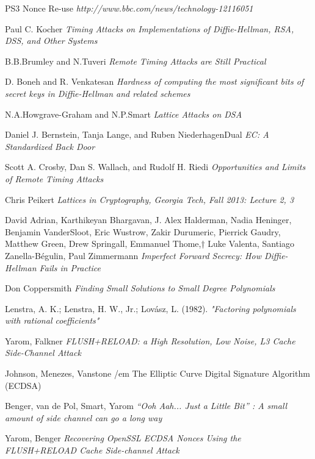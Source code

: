 \documentclass[a4paper,11pt]{article}
\begin{document}
\newpage

\begin{thebibliography}{1}

 PS3 Nonce Re-use {\em http://www.bbc.com/news/technology-12116051}

 Paul C. Kocher {\em Timing Attacks on Implementations of Diffie-Hellman, RSA, DSS, and Other Systems}

 B.B.Brumley and N.Tuveri {\em Remote Timing Attacks are Still Practical}

 D. Boneh and R. Venkatesan {\em Hardness of computing the most significant bits of secret keys in Diffie-Hellman and related schemes}

 N.A.Howgrave-Graham and N.P.Smart {\em Lattice Attacks on DSA}

 Daniel J. Bernstein, Tanja Lange, and Ruben NiederhagenDual {\em EC: A Standardized Back Door}

 Scott A. Crosby, Dan S. Wallach, and Rudolf H. Riedi {\em Opportunities and Limits of Remote Timing Attacks}

 Chris Peikert {\em Lattices in Cryptography, Georgia Tech, Fall 2013: Lecture 2, 3}

 David Adrian, Karthikeyan Bhargavan, J. Alex Halderman, Nadia Heninger, Benjamin VanderSloot, Eric Wustrow, Zakir Durumeric, Pierrick Gaudry, Matthew Green, Drew Springall, Emmanuel Thome,† Luke Valenta, Santiago Zanella-Bégulin, Paul Zimmermann {\em Imperfect Forward Secrecy: How Diffie-Hellman Fails in Practice}

 Don Coppersmith {\em Finding Small Solutions to Small Degree Polynomials}

 Lenstra, A. K.; Lenstra, H. W., Jr.; Lovász, L. (1982). {\em "Factoring polynomials with rational coefficients"}

 Yarom, Falkner {\em FLUSH+RELOAD: a High Resolution, Low Noise, L3 Cache Side-Channel Attack}

 Johnson, Menezes, Vanstone {/em The Elliptic Curve Digital Signature Algorithm (ECDSA)}

 Benger, van de Pol, Smart, Yarom {\em “Ooh Aah... Just a Little Bit” : A small amount of side channel can go a long way}

 Yarom, Benger {\em Recovering OpenSSL ECDSA Nonces Using the FLUSH+RELOAD Cache Side-channel Attack}


\end{thebibliography}
\end{document}
